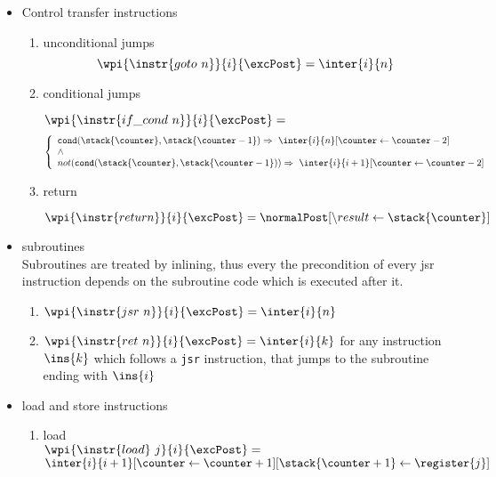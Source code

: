 \begin{itemize}	
\item Control transfer instructions
\begin{enumerate}
 \item unconditional jumps \\
$$\wpi{\instr{goto \  n}}{i} {\excPost} =   \inter{i}{n}$$

\item conditional jumps

$\wpi{\instr{if\_cond  \  n}}{i} {\excPost} =$
$$ \left\{ \begin{array}{l} 
 \texttt{cond}( \stack{\counter}, \stack{\counter - 1} ) \Rightarrow \ \inter{i}{n}[\counter \leftarrow \counter - 2 ] \\
  \wedge  \\
 not( \texttt{cond}( \stack{\counter},\stack{\counter - 1} ))  \Rightarrow \ \inter{i}{i+1}[\counter \leftarrow \counter - 2 ] \\
  \end{array}
\right.
 $$


 \item return 
 
 $\wpi{\instr{return}}{i} {\excPost}  = \normalPost[ \backslash result \leftarrow \stack{\counter}]$

\end{enumerate}


\item subroutines\\
Subroutines are treated by inlining, thus every the precondition of every jsr instruction depends on the subroutine code which is executed after it.
\begin{enumerate}

\item $ \wpi{\instr{jsr \ n}}{i}{\excPost} =  \inter{i}{n} $\\

\item$ \wpi{\instr{ret \ n}}{i}{\excPost} =  \inter{i}{k} $
for any instruction $\ins{k}$ which follows a \texttt{jsr} instruction, that jumps to the subroutine ending with $\ins{i}$
\end{enumerate}


\item  load and store instructions
	\begin{enumerate}
		\item load \\
		 $\wpi{\instr{load } \ j} {i} {\excPost}  = $ \\
		 $ \inter{i}{i+1}[\counter \leftarrow \counter   +1][  \stack{ \counter  + 1} \leftarrow \register{j}  ]$ \\
		

\end{enumerate}
\end{itemize}
